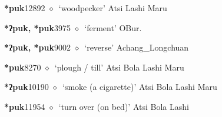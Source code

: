   \begin{list}{}{\leftmargin=1.5em \itemindent=-1.5em}
  \item {\footnotesize \textbf{*puk}}{\tiny 12892}
         $\diamond$~`woodpecker'
         Atsi 
\hspace{1ex}
         Lashi 
\hspace{1ex}
         Maru 
  \item {\footnotesize \textbf{*ʔpuk, *puk}}{\tiny 3975}
\hspace{1ex}
         $\diamond$~`ferment'
         OBur. 
  \item {\footnotesize \textbf{*ʔpuk, *puk}}{\tiny 9002}
\hspace{1ex}
         $\diamond$~`reverse'
         Achang\_Longchuan 
  \item {\footnotesize \textbf{*puk}}{\tiny 8270}
\hspace{1ex}
         $\diamond$~`plough / till'
         Atsi 
\hspace{1ex}
         Bola 
\hspace{1ex}
         Lashi 
\hspace{1ex}
         Maru 
  \item {\footnotesize \textbf{*ʔpuk}}{\tiny 10190}
\hspace{1ex}
         $\diamond$~`smoke (a cigarette)'
         Atsi 
\hspace{1ex}
         Bola 
\hspace{1ex}
         Lashi 
\hspace{1ex}
         Maru 
  \item {\footnotesize \textbf{*puk}}{\tiny 11954}
\hspace{1ex}
         $\diamond$~`turn over (on bed)'
         Atsi 
\hspace{1ex}
         Bola 
\hspace{1ex}
         Lashi 
\hspace{1ex}

\end{list}

